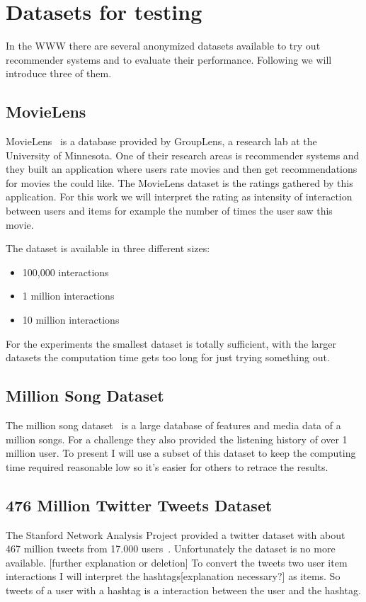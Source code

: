 \section{Datasets for testing}

In the WWW there are several anonymized datasets available to try
out recommender systems and to evaluate their performance. 
Following we will introduce three of them.


\subsection{MovieLens}
\label{movielens}

MovieLens~\cite{movielensdatasets} is a database provided by GroupLens, a research
lab at the University of Minnesota. One of their research areas is
recommender systems and they built an application where users rate
movies and then get recommendations for movies the could like. The
MovieLens dataset is the ratings gathered by this application. For
this work we will interpret the rating as intensity of interaction
between users and items for example the number of times the user saw
this movie.

The dataset is available in three different sizes:
\begin{itemize}
\item 100,000 interactions
\item 1 million interactions
\item 10 million interactions
\end{itemize}
For the experiments the smallest dataset is totally sufficient, with
the larger datasets the computation time gets too long for just trying
something out.


\subsection{Million Song Dataset}
The million song dataset~\cite{Bertin-Mahieux2011} is a large database of features and media data
of a million songs. For a challenge they also provided the listening history of over 1 million
user. To present I will use a subset of this dataset to keep the computing time required
reasonable low so it's easier for others to retrace the results.


\subsection{476 Million Twitter Tweets Dataset}
The Stanford Network Analysis Project provided a twitter dataset with about 467 million tweets from 17.000 users~\cite{snap}.
Unfortunately the dataset is no more available. [further explanation or deletion]
To convert the tweets two user item interactions I will interpret the hashtags[explanation necessary?] as items.
So tweets of a user with a hashtag is a interaction between the user and the hashtag.
